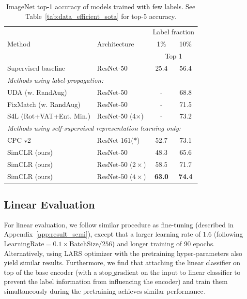 \documentclass{article}
\begin{document}
\begin{table}[h!]\small
    \centering
    \captionsetup{type=table} \begin{tabular}{@{\hspace{.2cm}}llcc@{\hspace{.2cm}}}
    \toprule
    \multirow{3}{*}{Method} & \multirow{3}{*}{Architecture} & \multicolumn{2}{c}{Label fraction} \\
    & & 1\% & 10\% \\
    & & \multicolumn{2}{c}{Top 1} \\
    \midrule
    Supervised baseline      & ResNet-50  &  25.4 & 56.4 \\ \midrule
    \multicolumn{4}{l}{\textit{Methods using label-propagation:}}         \\ 
UDA (w. RandAug)                        & ResNet-50 &  - & 68.8 \\
    FixMatch (w. RandAug)         & ResNet-50 & - & 71.5 \\
    S4L (Rot+VAT+Ent. Min.)          & ResNet-50 (4$\times$) &  - &  73.2\\ \midrule
    \multicolumn{4}{l}{\textit{Methods using self-supervised representation learning only:}}         \\ 
CPC v2 & ResNet-161($*$)            & 52.7  &  73.1 \\
    SimCLR (ours)   & ResNet-50        & 48.3
       & 	65.6   \\
    SimCLR (ours)   & ResNet-50 ($2\times$)           & 58.5  &  71.7  \\
    SimCLR (ours)    & ResNet-50 ($4\times$)           & \textbf{63.0}
       &  \textbf{74.4} \\
    \bottomrule
    \end{tabular}
    \caption{\label{tab:data_efficient_sota_top1}ImageNet top-1 accuracy of models trained with few labels. See Table~\ref{tab:data_efficient_sota} for top-5 accuracy.}
\end{table}



\subsection{Linear Evaluation}
\label{app:result_linear}

For linear evaluation, we follow similar procedure as fine-tuning (described in Appendix~\ref{app:result_semi}), except that a larger learning rate of 1.6 (following $\mathrm{LearningRate}=0.1\times\mathrm{BatchSize}/256$) and longer training of 90 epochs. Alternatively, using LARS optimizer with the pretraining hyper-parameters also yield similar results. Furthermore, we find that attaching the linear classifier on top of the base encoder (with a $\mathrm{stop\_gradient}$ on the input to linear classifier to prevent the label information from influencing the encoder) and train them simultaneously during the pretraining achieves similar performance.
\end{document}
